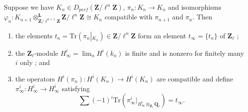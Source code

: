 \begin{lemma}
\label{lemma-piece-together}
Suppose we have
$K_n\in D_{perf}(\mathbf{Z}/\ell^n\mathbf{Z})$, $\pi_n: K_n\to K_n$
and isomorphisms
$ \varphi_n:
K_{n+1}
\otimes^{\mathbf{L}}_{\mathbf{Z}/\ell^{n+1}\mathbf{Z}}
\mathbf{Z}/\ell^n\mathbf{Z}
\cong K_n$
compatible with $\pi_{n+1}$ and $\pi_n$. Then
\begin{enumerate}
\item
the elements $t_n=\text{Tr}(\pi_n\left|_{K_n}\right.)\in
\mathbf{Z}/\ell^n\mathbf{Z}$ form an element $t_\infty=\{t_n\}$ of
$\mathbf{Z}_\ell$ ;
\item
the $\mathbf{Z}_\ell$-module $H_\infty^i=\lim_n H^i(k_n)$ is finite and
is nonzero for finitely many $i$ only ; and
\item
the operators $H^i(\pi_n): H^i(K_n)\to H^i(K_n)$ are compatible and define
$\pi_\infty^i: H_\infty^i\to H_\infty^i$ satisfying
$$
\sum(-1)^i
\text{Tr}
\left(
\pi_\infty^i \big|_{H_\infty^i \otimes_{\mathbf{Z}_\ell}\mathbf{Q}_\ell}
\right) = t_\infty.
$$
\end{enumerate}
\end{lemma}

